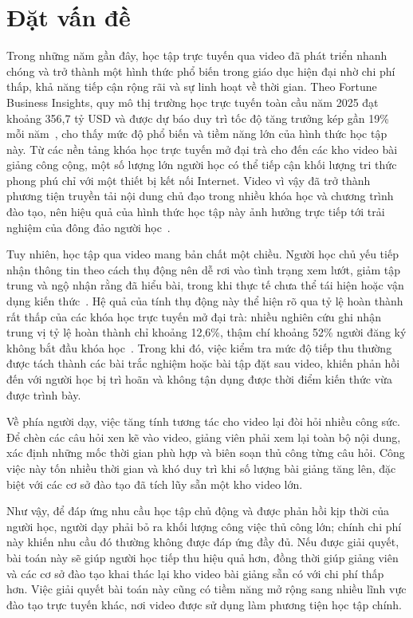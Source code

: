 \documentclass[../DoAn.tex]{subfiles}
\begin{document}
\section{Đặt vấn đề}
\label{section:1.1}
Trong những năm gần đây, học tập trực tuyến qua video đã phát triển nhanh chóng và trở thành một hình thức phổ biến trong giáo dục hiện đại nhờ chi phí thấp, khả năng tiếp cận rộng rãi và sự linh hoạt về thời gian. Theo Fortune Business Insights, quy mô thị trường học trực tuyến toàn cầu năm 2025 đạt khoảng 356,7 tỷ USD và được dự báo duy trì tốc độ tăng trưởng kép gần 19\% mỗi năm~\cite{fortune2025elearning}, cho thấy mức độ phổ biến và tiềm năng lớn của hình thức học tập này. Từ các nền tảng khóa học trực tuyến mở đại trà cho đến các kho video bài giảng công cộng, một số lượng lớn người học có thể tiếp cận khối lượng tri thức phong phú chỉ với một thiết bị kết nối Internet. Video vì vậy đã trở thành phương tiện truyền tải nội dung chủ đạo trong nhiều khóa học và chương trình đào tạo, nên hiệu quả của hình thức học tập này ảnh hưởng trực tiếp tới trải nghiệm của đông đảo người học~\cite{brame2016effective}.

Tuy nhiên, học tập qua video mang bản chất một chiều. Người học chủ yếu tiếp nhận thông tin theo cách thụ động nên dễ rơi vào tình trạng xem lướt, giảm tập trung và ngộ nhận rằng đã hiểu bài, trong khi thực tế chưa thể tái hiện hoặc vận dụng kiến thức~\cite{prince2004active,karpicke2008critical}. Hệ quả của tính thụ động này thể hiện rõ qua tỷ lệ hoàn thành rất thấp của các khóa học trực tuyến mở đại trà: nhiều nghiên cứu ghi nhận trung vị tỷ lệ hoàn thành chỉ khoảng 12,6\%, thậm chí khoảng 52\% người đăng ký không bắt đầu khóa học~\cite{celik2024mooc}. Trong khi đó, việc kiểm tra mức độ tiếp thu thường được tách thành các bài trắc nghiệm hoặc bài tập đặt sau video, khiến phản hồi đến với người học bị trì hoãn và không tận dụng được thời điểm kiến thức vừa được trình bày.

Về phía người dạy, việc tăng tính tương tác cho video lại đòi hỏi nhiều công sức. Để chèn các câu hỏi xen kẽ vào video, giảng viên phải xem lại toàn bộ nội dung, xác định những mốc thời gian phù hợp và biên soạn thủ công từng câu hỏi. Công việc này tốn nhiều thời gian và khó duy trì khi số lượng bài giảng tăng lên, đặc biệt với các cơ sở đào tạo đã tích lũy sẵn một kho video lớn.

Như vậy, để đáp ứng nhu cầu học tập chủ động và được phản hồi kịp thời của người học, người dạy phải bỏ ra khối lượng công việc thủ công lớn; chính chi phí này khiến nhu cầu đó thường không được đáp ứng đầy đủ. Nếu được giải quyết, bài toán này sẽ giúp người học tiếp thu hiệu quả hơn, đồng thời giúp giảng viên và các cơ sở đào tạo khai thác lại kho video bài giảng sẵn có với chi phí thấp hơn. Việc giải quyết bài toán này cũng có tiềm năng mở rộng sang nhiều lĩnh vực đào tạo trực tuyến khác, nơi video được sử dụng làm phương tiện học tập chính.
\end{document}
